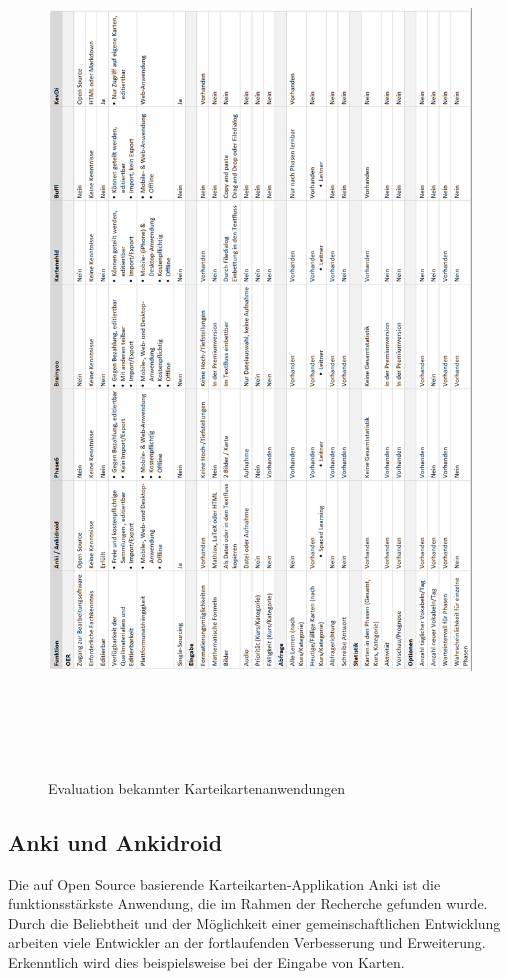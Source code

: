 \begin{figure}[htbp]
\begin{center}
\includegraphics[width = 15cm, height=23cm]{evaluation.png}
\caption{Evaluation bekannter Karteikartenanwendungen}
\label{Evaluation bekannter Karteikartenanwendungen}

\end{center}
\end{figure}

\subsection{Anki und Ankidroid}
Die auf Open Source basierende Karteikarten-Applikation Anki \cite{ankiwebseite} \cite{ankidev} ist die funktionsstärkste Anwendung, die im Rahmen der Recherche gefunden wurde. Durch die Beliebtheit und der Möglichkeit einer gemeinschaftlichen Entwicklung arbeiten viele Entwickler an der fortlaufenden Verbesserung und Erweiterung. Erkenntlich wird dies beispielsweise bei der Eingabe von Karten. \\

